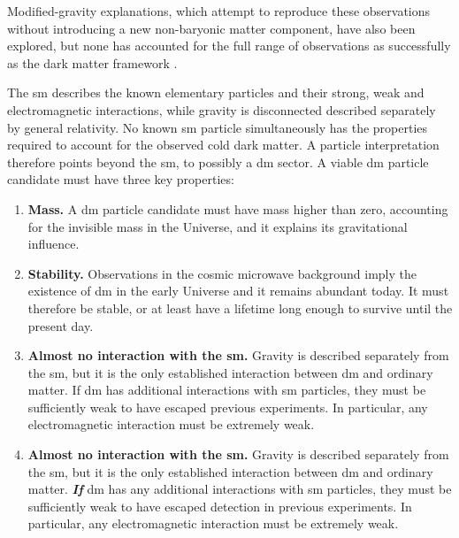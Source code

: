 Modified-gravity explanations, which attempt to reproduce these observations
without introducing a new non-baryonic matter component, have also been
explored, but none has accounted for the full range of observations as
successfully as the dark matter framework
\cite{bertone2016-history-dark-matter,cirelli2026-darkmatter}. 

The \gls{sm} describes the known elementary particles and their strong, weak
and electromagnetic interactions, while gravity is disconnected described separately by
general relativity. No known \gls{sm} particle simultaneously has the
properties required to account for the observed cold dark matter. A particle
interpretation therefore points beyond the \gls{sm}, to possibly a \gls{dm} sector. 
A viable \gls{dm} particle
candidate must have three key properties:




\begin{enumerate}
    \item \textbf{Mass.} A \gls{dm} particle candidate must have mass higher than zero, accounting for the invisible mass in the Universe, and it explains its gravitational influence.
    \item \textbf{Stability.} 
    Observations in the cosmic microwave background imply 
    the existence of \gls{dm} in the early Universe and it remains abundant today. It must therefore be stable, or at least have a lifetime long
    enough to survive until the present day.
    \item \textbf{Almost no interaction with the \gls{sm}.} Gravity is described separately from the \gls{sm}, but it is the only established interaction between \gls{dm} and ordinary
    matter. If \gls{dm} has additional interactions with \gls{sm} particles,
    they must be sufficiently weak to have escaped previous experiments. In
    particular, any electromagnetic interaction must be extremely weak.
    
    \item \textbf{Almost no interaction with the \gls{sm}.}
Gravity is described separately from the \gls{sm}, but it is the only
established interaction between \gls{dm} and ordinary matter.
\textbf{\emph{If}} \gls{dm} has any additional interactions with
\gls{sm} particles, they must be sufficiently weak to have escaped detection
in previous experiments. In particular, any electromagnetic interaction must
be extremely weak.
\end{enumerate}


